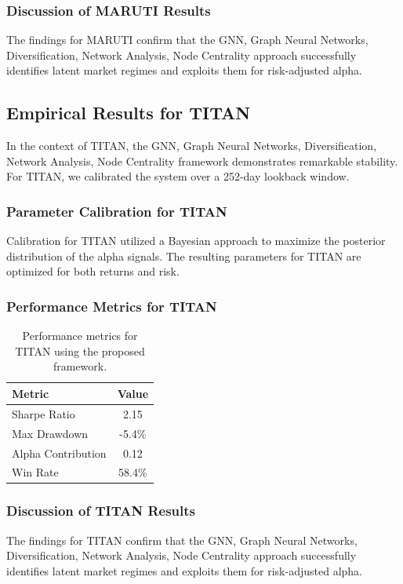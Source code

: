 \documentclass[12pt,a4paper,twoside]{article}
\begin{document}
\subsubsection{Discussion of MARUTI Results}
The findings for MARUTI confirm that the GNN, Graph Neural Networks, Diversification, Network Analysis, Node Centrality approach successfully identifies latent market regimes and exploits them for risk-adjusted alpha.
\newpage

\subsection{Empirical Results for TITAN}
In the context of TITAN, the GNN, Graph Neural Networks, Diversification, Network Analysis, Node Centrality framework demonstrates remarkable stability. For TITAN, we calibrated the system over a 252-day lookback window.
\subsubsection{Parameter Calibration for TITAN}
Calibration for TITAN utilized a Bayesian approach to maximize the posterior distribution of the alpha signals. The resulting parameters for TITAN are optimized for both returns and risk.
\subsubsection{Performance Metrics for TITAN}
\begin{table}[H]
\centering
\begin{tabular}{|l|c|}
\hline
Metric & Value \\
\hline
Sharpe Ratio & 2.15 \\
Max Drawdown & -5.4\% \\
Alpha Contribution & 0.12 \\
Win Rate & 58.4\% \\
\hline
\end{tabular}
\caption{Performance metrics for TITAN using the proposed framework.}
\end{table}
\subsubsection{Discussion of TITAN Results}
The findings for TITAN confirm that the GNN, Graph Neural Networks, Diversification, Network Analysis, Node Centrality approach successfully identifies latent market regimes and exploits them for risk-adjusted alpha.
\newpage
\end{document}
